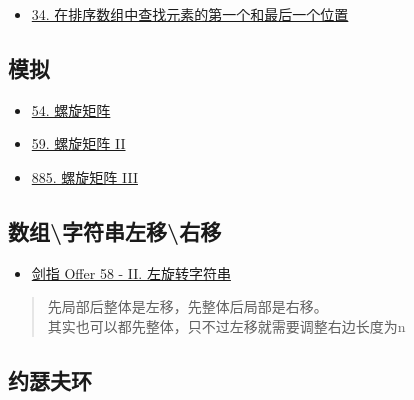 \documentclass[
]{article}
\begin{document}
\begin{itemize}
\item
  \href{https://leetcode-cn.com/problems/find-first-and-last-position-of-element-in-sorted-array/}{34.
  在排序数组中查找元素的第一个和最后一个位置}
\end{itemize}

\hypertarget{ux6a21ux62df}{%
\subsection{模拟}\label{ux6a21ux62df}}

\begin{itemize}
\item
  \href{https://leetcode-cn.com/problems/spiral-matrix/}{54. 螺旋矩阵}
\item
  \href{https://leetcode-cn.com/problems/spiral-matrix-ii/}{59. 螺旋矩阵
  II}
\item
  \href{https://leetcode-cn.com/problems/spiral-matrix-iii/}{885.
  螺旋矩阵 III}
\end{itemize}

\hypertarget{ux6570ux7ec4ux5b57ux7b26ux4e32ux5de6ux79fbux53f3ux79fb}{%
\subsection{数组\textbackslash 字符串左移\textbackslash 右移}\label{ux6570ux7ec4ux5b57ux7b26ux4e32ux5de6ux79fbux53f3ux79fb}}

\begin{itemize}
\item
  \href{https://leetcode-cn.com/problems/zuo-xuan-zhuan-zi-fu-chuan-lcof/}{剑指
  Offer 58 - II. 左旋转字符串}
\end{itemize}

\begin{quote}
先局部后整体是左移，先整体后局部是右移。\\
其实也可以都先整体，只不过左移就需要调整右边长度为n
\end{quote}

\hypertarget{ux7ea6ux745fux592bux73af}{%
\subsection{\texorpdfstring{约瑟夫环
}{约瑟夫环 }}\label{ux7ea6ux745fux592bux73af}}
\end{document}
